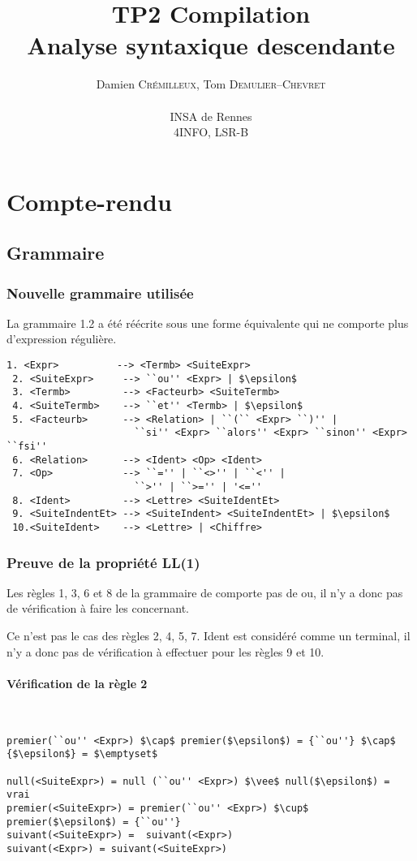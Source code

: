 \documentclass[a4paper]{article}
\author{
  Damien \textsc{Crémilleux}, Tom \textsc{Demulier--Chevret} \\ \\
  INSA de Rennes \\
  4INFO, LSR-B
}
\title{TP2 Compilation \\ Analyse syntaxique descendante}
\date{}
\begin{document}
\maketitle

\section{Compte-rendu}

\subsection{Grammaire}

\subsubsection{Nouvelle grammaire utilisée}

La grammaire 1.2 a été réécrite sous une forme équivalente qui ne comporte plus d'expression  régulière.

\begin{lstlisting}[frame=single]
 1. <Expr>          --> <Termb> <SuiteExpr>
 2. <SuiteExpr>     --> ``ou'' <Expr> | $\epsilon$
 3. <Termb>         --> <Facteurb> <SuiteTermb>
 4. <SuiteTermb>    --> ``et'' <Termb> | $\epsilon$
 5. <Facteurb>      --> <Relation> | ``(`` <Expr> ``)'' |
                      ``si'' <Expr> ``alors'' <Expr> ``sinon'' <Expr> ``fsi''
 6. <Relation>      --> <Ident> <Op> <Ident>
 7. <Op>            --> ``='' | ``<>'' | ``<'' |
                      ``>'' | ``>='' | '<=''
 8. <Ident>         --> <Lettre> <SuiteIdentEt>
 9. <SuiteIndentEt> --> <SuiteIndent> <SuiteIndentEt> | $\epsilon$
 10.<SuiteIdent>    --> <Lettre> | <Chiffre>
\end{lstlisting}

\subsubsection{Preuve de la propriété LL(1)}

Les règles 1, 3, 6 et 8 de la grammaire de comporte pas de ou, il n'y a donc pas de vérification à faire les concernant.

Ce n'est pas le cas des règles 2, 4, 5, 7. Ident est considéré comme un terminal, il n'y a donc pas de vérification à effectuer pour les règles 9 et 10.

\paragraph{Vérification de la règle 2}
~
\begin{lstlisting}
premier(``ou'' <Expr>) $\cap$ premier($\epsilon$) = {``ou''} $\cap$ {$\epsilon$} = $\emptyset$

null(<SuiteExpr>) = null (``ou'' <Expr>) $\vee$ null($\epsilon$) = vrai
premier(<SuiteExpr>) = premier(``ou'' <Expr>) $\cup$ premier($\epsilon$) = {``ou''}
suivant(<SuiteExpr>) =  suivant(<Expr>)
suivant(<Expr>) = suivant(<SuiteExpr>)
\end{lstlisting}
\end{document}
